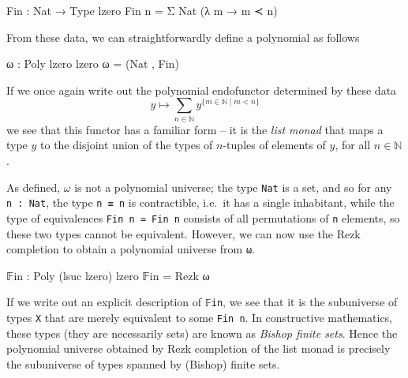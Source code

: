 \documentclass[
  11pt,
  oneside,
  article]{memoir}
\newenvironment{Shaded}{}{}
\newcommand{\NormalTok}[1]{#1}
\newcommand{\OtherTok}[1]{\textcolor[rgb]{0.00,0.44,0.13}{#1}}
\theoremstyle{definition}
\theoremstyle{plain}
\newcommand{\0}{\textsf{0}}
\newcommand{\1}{\tn{\textsf{1}}}
\begin{document}
\begin{Shaded}
\begin{Highlighting}[]
\NormalTok{    Fin }\OtherTok{:}\NormalTok{ Nat }\OtherTok{→}\NormalTok{ Type lzero}
\NormalTok{    Fin n }\OtherTok{=}\NormalTok{ Σ Nat }\OtherTok{(λ}\NormalTok{ m }\OtherTok{→}\NormalTok{ m ≺ n}\OtherTok{)}
\end{Highlighting}
\end{Shaded}

From these data, we can straightforwardly define a polynomial as follows

\begin{Shaded}
\begin{Highlighting}[]
\NormalTok{    ω }\OtherTok{:}\NormalTok{ Poly lzero lzero}
\NormalTok{    ω }\OtherTok{=} \OtherTok{(}\NormalTok{Nat , Fin}\OtherTok{)}
\end{Highlighting}
\end{Shaded}

If we once again write out the polynomial endofunctor determined by
these data \[
    y \mapsto \sum_{n \in \mathbb{N}} y^{\{m \in \mathbb{N} \mid m < n\}}
\] we see that this functor has a familiar form -- it is the \emph{list
monad} that maps a type \(y\) to the disjoint union of the types of
\(n\)-tuples of elements of \(y\), for all \(n \in \mathbb{N}\).

As defined, \(\omega\) is not a polynomial universe; the type
\texttt{Nat} is a set, and so for any \texttt{n\ :\ Nat}, the type
\texttt{n\ ≡\ n} is contractible, i.e.~it has a single inhabitant, while
the type of equivalences \texttt{Fin\ n\ ≃\ Fin\ n} consists of all
permutations of \texttt{n} elements, so these two types cannot be
equivalent. However, we can now use the Rezk completion to obtain a
polynomial universe from \texttt{ω}.

\begin{Shaded}
\begin{Highlighting}[]
\NormalTok{    𝔽in }\OtherTok{:}\NormalTok{ Poly }\OtherTok{(}\NormalTok{lsuc lzero}\OtherTok{)}\NormalTok{ lzero}
\NormalTok{    𝔽in }\OtherTok{=}\NormalTok{ Rezk ω}
\end{Highlighting}
\end{Shaded}

If we write out an explicit description of \texttt{𝔽in}, we see that it
is the subuniverse of types \texttt{X} that are merely equivalent to
some \texttt{Fin\ n}. In constructive mathematics, these types (they are
necessarily sets) are known as \emph{Bishop finite sets}. Hence the
polynomial universe obtained by Rezk completion of the list monad is
precisely the subuniverse of types spanned by (Bishop) finite sets.
\end{document}
